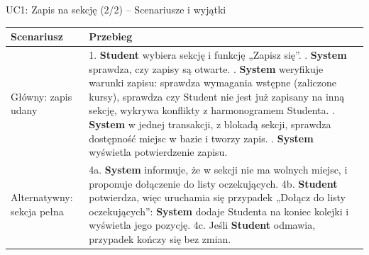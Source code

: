 \documentclass[aspectratio=169, 10pt, xcolor=table]{beamer}
\renewcommand{\arraystretch}{1.18}
\begin{document}
\begin{frame}[shrink=6]{UC1: Zapis na sekcję (2/2) -- Scenariusze i wyjątki}
    \scriptsize
    \renewcommand{\arraystretch}{1.08}
    \begin{tabularx}{\textwidth}{|U{3.5cm}|Y|}
        \hline
        \textcolor{NavyPrimary}{\textbf{Scenariusz}} & \textcolor{NavyPrimary}{\textbf{Przebieg}} \\
        \hline
        Główny: zapis udany &
        1. \textbf{Student} wybiera sekcję i funkcję „Zapisz się”. . \textbf{System} sprawdza, czy zapisy są otwarte. . \textbf{System} weryfikuje warunki zapisu: sprawdza wymagania wstępne (zaliczone kursy), sprawdza czy Student nie jest już zapisany na inną sekcję, wykrywa konflikty z harmonogramem Studenta. . \textbf{System} w jednej transakcji, z blokadą sekcji, sprawdza dostępność miejsc w bazie i tworzy zapis. . \textbf{System} wyświetla potwierdzenie zapisu. \\
        \hline
        Alternatywny: sekcja pełna  &
        4a. \textbf{System} informuje, że w sekcji nie ma wolnych miejsc, i proponuje dołączenie do listy oczekujących. \newline
        4b. \textbf{Student} potwierdza, więc uruchamia się przypadek „Dołącz do listy oczekujących”: \textbf{System} dodaje Studenta na koniec kolejki i wyświetla jego pozycję. \newline
        4c. Jeśli \textbf{Student} odmawia, przypadek kończy się bez zmian. \\
        \hline
    \end{tabularx}


\end{frame}
\end{document}
